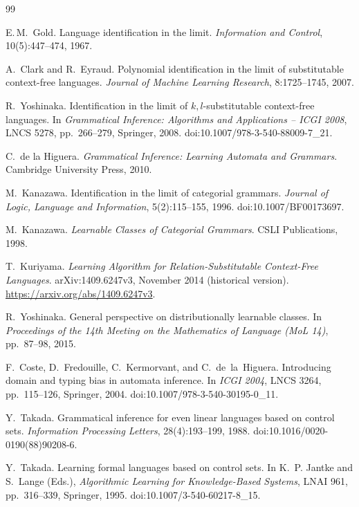 \documentclass[11pt,a4paper]{ltjsarticle}
\theoremstyle{remark}
\theoremstyle{plain}
\begin{document}
\begin{thebibliography}{99}

E.\,M.~Gold.
Language identification in the limit.
\textit{Information and Control}, 10(5):447--474, 1967.

A.~Clark and R.~Eyraud.
Polynomial identification in the limit of substitutable
context-free languages.
\textit{Journal of Machine Learning Research},
8:1725--1745, 2007.

R.~Yoshinaka.
Identification in the limit of $k, l$-substitutable
context-free languages.
In \textit{Grammatical Inference: Algorithms and Applications -- ICGI 2008},
LNCS 5278, pp.~266--279, Springer, 2008.
doi:10.1007/978-3-540-88009-7\_21.

C.~de la Higuera.
\textit{Grammatical Inference: Learning Automata and Grammars}.
Cambridge University Press, 2010.

M.~Kanazawa.
\newblock Identification in the limit of categorial grammars.
\newblock \textit{Journal of Logic, Language and Information},
5(2):115--155, 1996. doi:10.1007/BF00173697.

M.~Kanazawa.
\newblock \emph{Learnable Classes of Categorial Grammars}.
\newblock CSLI Publications, 1998.

T.~Kuriyama.
\newblock \emph{Learning Algorithm for Relation-Substitutable Context-Free Languages}.
\newblock arXiv:1409.6247v3, November 2014 (historical version).
\newblock \url{https://arxiv.org/abs/1409.6247v3}.

R.~Yoshinaka.
\newblock General perspective on distributionally learnable classes.
\newblock In \emph{Proceedings of the 14th Meeting on the Mathematics
of Language (MoL 14)}, pp.~87--98, 2015.

F.~Coste, D.~Fredouille, C.~Kermorvant, and C.~de~la~Higuera.
\newblock Introducing domain and typing bias in automata inference.
\newblock In \textit{ICGI 2004}, LNCS 3264, pp.~115--126, Springer, 2004.
doi:10.1007/978-3-540-30195-0\_11.

Y.~Takada.
\newblock Grammatical inference for even linear languages based on control sets.
\newblock \textit{Information Processing Letters}, 28(4):193--199, 1988.
doi:10.1016/0020-0190(88)90208-6.

Y.~Takada.
\newblock Learning formal languages based on control sets.
\newblock In K.~P. Jantke and S.~Lange (Eds.), \textit{Algorithmic Learning
for Knowledge-Based Systems}, LNAI 961, pp.~316--339, Springer, 1995.
doi:10.1007/3-540-60217-8\_15.


\end{thebibliography}
\end{document}
